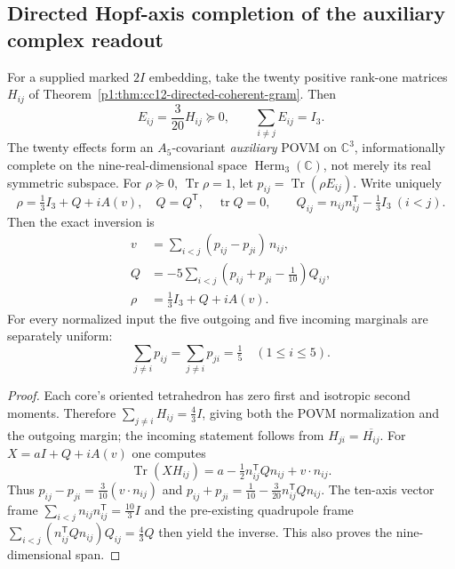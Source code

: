 \documentclass[12pt,a4paper]{article}
\begin{document}
\subsection{Directed Hopf-axis completion of the auxiliary complex readout}
\label{p2c:sec:cc12-complex-axis-completion}
\begin{theorem}
\label{p2c:thm:cc12-twenty-complex-povm}
For a supplied marked $2I$ embedding, take the twenty positive rank-one
matrices $H_{ij}$ of
Theorem~\ref{p1:thm:cc12-directed-coherent-gram}. Then
\[
 E_{ij}=\frac3{20}H_{ij}\succeq0,\qquad
 \boxed{\sum_{i\ne j}E_{ij}=I_3.}
\]
The twenty effects form an $A_5$-covariant \emph{auxiliary} POVM on
$\mathbb C^3$, informationally complete on the nine-real-dimensional
space $\operatorname{Herm}_3(\mathbb C)$, not merely its real symmetric
subspace. For $\rho\succeq0$, $\operatorname{Tr}\rho=1$, let
$p_{ij}=\operatorname{Tr}(\rho E_{ij})$. Write uniquely
\[
 \rho=\tfrac13 I_3+Q+iA(v),\quad Q=Q^{\mathsf T},\quad
 \operatorname{tr}Q=0,\qquad
 Q_{ij}=n_{ij}n_{ij}^{\mathsf T}-\tfrac13 I_3\ (i<j).
\]
Then the exact inversion is
\[
 \boxed{\begin{aligned}
 v&=\sum_{i<j}(p_{ij}-p_{ji})\,n_{ij},\\
 Q&=-5\sum_{i<j}(p_{ij}+p_{ji}-\tfrac1{10})Q_{ij},\\
 \rho&=\tfrac13I_3+Q+iA(v).
 \end{aligned}}
\]
For every normalized input the five outgoing and five incoming
marginals are separately uniform:
\[
 \boxed{\sum_{j\ne i}p_{ij}
       =\sum_{j\ne i}p_{ji}=\tfrac15\quad(1\le i\le5).}
\]
\end{theorem}
\begin{proof}
Each core's oriented tetrahedron has zero first and isotropic second
moments. Therefore $\sum_{j\ne i}H_{ij}=\tfrac43I$, giving both the
POVM normalization and the outgoing margin; the incoming statement
follows from $H_{ji}=\overline{H_{ij}}$. For
$X=aI+Q+iA(v)$ one computes
\[
 \operatorname{Tr}(XH_{ij})=
 a-\tfrac12n_{ij}^{\mathsf T}Qn_{ij}+v\cdot n_{ij}.
\]
Thus $p_{ij}-p_{ji}=\tfrac3{10}(v\cdot n_{ij})$ and
$p_{ij}+p_{ji}=\tfrac1{10}-\tfrac3{20}
 n_{ij}^{\mathsf T}Qn_{ij}$.
The ten-axis vector frame $\sum_{i<j}n_{ij}n_{ij}^{\mathsf T}
=\tfrac{10}{3}I$ and the pre-existing quadrupole frame
$\sum_{i<j}(n_{ij}^{\mathsf T}Qn_{ij})Q_{ij}=\tfrac43Q$
then yield the inverse. This also proves the nine-dimensional span.
\end{proof}
\end{document}
